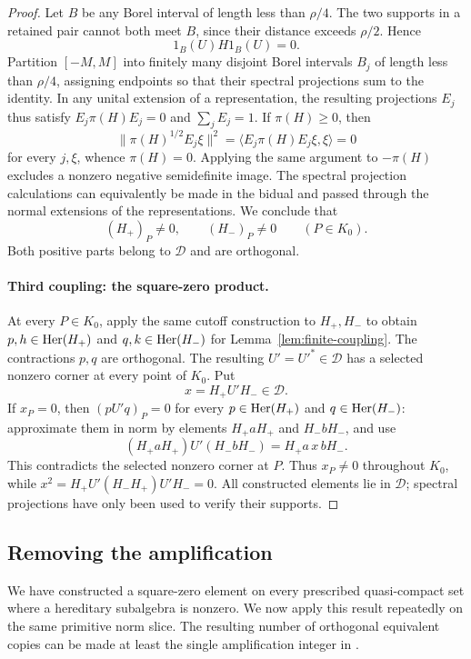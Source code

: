 \begin{proof}
Let $B$ be any Borel interval of length less than $\rho/4$.
The two supports in a retained pair cannot both meet $B$, since
their distance exceeds $\rho/2$.  Hence
\[
 1_B(U)H1_B(U)=0.
\]
Partition $[-M,M]$ into finitely many disjoint Borel intervals
$B_j$ of length less than $\rho/4$, assigning endpoints so that
their spectral projections sum to the identity.  In any unital
extension of a representation, the resulting projections $E_j$
thus satisfy $E_j\pi(H)E_j=0$ and $\sum_jE_j=1$.
If $\pi(H)\ge0$, then
\[
 \|\pi(H)^{1/2}E_j\xi\|^2
 =\langle E_j\pi(H)E_j\xi,\xi\rangle=0
\]
for every $j,\xi$, whence $\pi(H)=0$.  Applying the same argument
to $-\pi(H)$ excludes a nonzero negative semidefinite image.
The spectral projection calculations can equivalently be made
in the bidual and passed through the normal extensions of the
representations.  We conclude that
\begin{equation}\label{eq:bothsigns}
 (H_+)_P\ne0,\qquad (H_-)_P\ne0
 \qquad(P\in K_0).
\end{equation}
Both positive parts belong to $\mathcal D$ and are orthogonal.

\paragraph{Third coupling: the square-zero product.}
At every $P\in K_0$, apply the same cutoff construction to $H_+,H_-$
to obtain $p,h\in\operatorname{Her}(H_+)$ and $q,k\in\operatorname{Her}(H_-)$ for
Lemma~\ref{lem:finite-coupling}.  The contractions $p,q$ are
orthogonal.  The resulting
$U'=U'^*\in\mathcal D$ has a selected nonzero corner at every
point of $K_0$.  Put
\[
 x=H_+U'H_-\in\mathcal D.
\]
If $x_P=0$, then $(pU'q)_P=0$ for every
$p\in\operatorname{Her}(H_+)$ and $q\in\operatorname{Her}(H_-)$: approximate them in
norm by elements $H_+aH_+$ and $H_-bH_-$, and use
\[
 (H_+aH_+)U'(H_-bH_-)=H_+a\,x\,bH_-.
\]
This contradicts the selected nonzero corner at $P$.
Thus $x_P\ne0$ throughout $K_0$, while
$x^2=H_+U'(H_-H_+)U'H_-=0$.
All constructed elements lie in $\mathcal D$; spectral
projections have only been used to verify their supports.
\end{proof}

\subsection{Removing the amplification}

We have constructed a square-zero element on every prescribed
quasi-compact set where a hereditary subalgebra is nonzero.  We now
apply this result repeatedly on the same primitive norm slice.  The
resulting number of orthogonal equivalent copies can be made at least
the single amplification integer in \propF{}.

